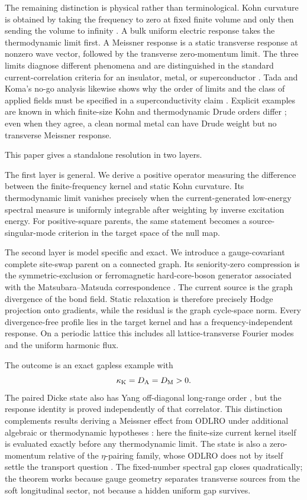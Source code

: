 \documentclass[11pt]{article}
\theoremstyle{definition}
\theoremstyle{remark}
\begin{document}
The remaining distinction is physical rather than terminological.  Kohn curvature is obtained by taking
the frequency to zero at fixed finite volume and only then sending the volume to infinity
\cite{Kohn1964}.  A bulk uniform electric response takes the thermodynamic limit first.  A Meissner
response is a static transverse response at nonzero wave vector, followed by the transverse
zero-momentum limit.  The three limits diagnose different phenomena and are distinguished in the
standard current-correlation criteria for an insulator, metal, or superconductor
\cite{Scalapino1992,Scalapino1993,Resta2018,Watanabe2020}.  Tada and Koma's no-go analysis likewise
shows why the order of limits and the class of applied fields must be specified in a superconductivity
claim \cite{Tada2016}.  Explicit examples are known in which finite-size Kohn and thermodynamic Drude
orders differ \cite{Takasan2023}; even when they agree, a clean normal metal can have Drude weight but
no transverse Meissner response.

This paper gives a standalone resolution in two layers.

The first layer is general.  We derive a positive operator measuring the difference between the
finite-frequency kernel and static Kohn curvature.  Its thermodynamic limit vanishes precisely when the
current-generated low-energy spectral measure is uniformly integrable after weighting by inverse
excitation energy.  For positive-square parents, the same statement becomes a source-singular-mode
criterion in the target space of the null map.

The second layer is model specific and exact.  We introduce a gauge-covariant complete site-swap parent
on a connected graph.  Its seniority-zero compression is the symmetric-exclusion or ferromagnetic
hard-core-boson generator associated with the Matsubara--Matsuda correspondence
\cite{Matsubara1956}.  The current source is the graph divergence of the bond field.  Static relaxation is
therefore precisely Hodge projection onto gradients, while the residual is the graph cycle-space norm.
Every divergence-free profile lies in the target kernel and has a frequency-independent response.  On a
periodic lattice this includes all lattice-transverse Fourier modes and the uniform harmonic flux.

The outcome is an exact gapless example with
\[
 \kappa_{\rm K}=D_{\rm A}=D_{\rm M}>0.
\]
The paired Dicke state also has Yang off-diagonal long-range order \cite{Yang1962}, but the response
identity is proved independently of that correlator.  This distinction complements results deriving a
Meissner effect from ODLRO under additional algebraic or thermodynamic hypotheses
\cite{Sewell1990,Nieh1995}: here the finite-size current kernel itself is evaluated exactly before any
thermodynamic limit.  The state is also a zero-momentum relative of the $\eta$-pairing family, whose ODLRO
does not by itself settle the transport question \cite{Yang1989}.  The fixed-number spectral gap closes
quadratically; the theorem works because gauge geometry separates transverse sources from the soft
longitudinal sector, not because a hidden uniform gap survives.
\end{document}
